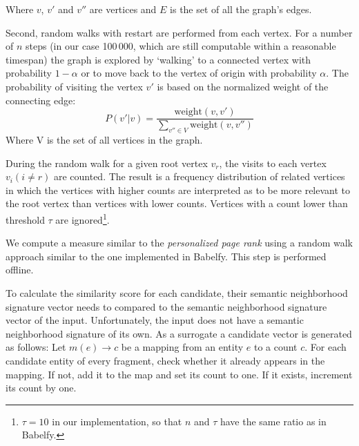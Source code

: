 \documentclass[runningheads,a4paper]{llncs}
\begin{document}
{Where $v$, $v'$ and $v''$ are vertices and $E$ is the set of all the graph's edges.

Second, random walks with restart are performed from each vertex. %
For a number of $n$ steps (in our case 100\,000, which are still computable within a reasonable timespan) the graph is explored by `walking' to a connected vertex with probability $1 - \alpha$ or to move back to the vertex of origin with probability $\alpha$. The probability of visiting the vertex $v'$ is based on the normalized weight of the connecting edge:
$$P(v'|v) = \frac{\mathrm{weight}(v, v')}{\sum\limits_{v''\in V} \mathrm{weight}(v, v'')}$$
Where V is the set of all vertices in the graph. 

During the random walk for a given root vertex $v_r$, the visits to each vertex $v_i (i \neq r)$ are counted. The result is a frequency distribution of related vertices in which the vertices with higher counts are interpreted as to be more relevant to the root vertex than vertices with lower counts. Vertices with a count lower than threshold $\tau$ are ignored\footnote{$\tau = 10$ in our implementation, so that $n$ and $\tau$ have the same ratio as in Babelfy.}.

We compute a measure similar to the \emph{personalized page rank} \cite{personalized_page_rank} using a random walk approach similar to the one implemented in Babelfy. This step is performed offline.

To calculate the similarity score for each candidate, their semantic neighborhood signature vector needs to compared to the semantic neighborhood signature vector of the input. Unfortunately, the input does not have a semantic neighborhood signature of its own. As a surrogate a candidate vector is generated as follows: Let $m(e) \rightarrow c$ be a mapping from an entity $e$ to a count $c$. For each candidate entity of every fragment, check whether it already appears in the mapping. If not, add it to the map and set its count to one. If it exists, increment its count by one.

}
\end{document}
